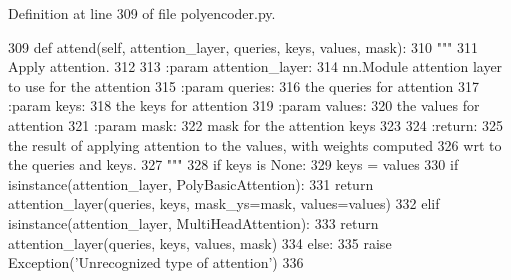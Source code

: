 Definition at line 309 of file polyencoder.\+py.


\begin{DoxyCode}
309     \textcolor{keyword}{def }attend(self, attention\_layer, queries, keys, values, mask):
310         \textcolor{stringliteral}{"""}
311 \textcolor{stringliteral}{        Apply attention.}
312 \textcolor{stringliteral}{}
313 \textcolor{stringliteral}{        :param attention\_layer:}
314 \textcolor{stringliteral}{            nn.Module attention layer to use for the attention}
315 \textcolor{stringliteral}{        :param queries:}
316 \textcolor{stringliteral}{            the queries for attention}
317 \textcolor{stringliteral}{        :param keys:}
318 \textcolor{stringliteral}{            the keys for attention}
319 \textcolor{stringliteral}{        :param values:}
320 \textcolor{stringliteral}{            the values for attention}
321 \textcolor{stringliteral}{        :param mask:}
322 \textcolor{stringliteral}{            mask for the attention keys}
323 \textcolor{stringliteral}{}
324 \textcolor{stringliteral}{        :return:}
325 \textcolor{stringliteral}{            the result of applying attention to the values, with weights computed}
326 \textcolor{stringliteral}{            wrt to the queries and keys.}
327 \textcolor{stringliteral}{        """}
328         \textcolor{keywordflow}{if} keys \textcolor{keywordflow}{is} \textcolor{keywordtype}{None}:
329             keys = values
330         \textcolor{keywordflow}{if} isinstance(attention\_layer, PolyBasicAttention):
331             \textcolor{keywordflow}{return} attention\_layer(queries, keys, mask\_ys=mask, values=values)
332         \textcolor{keywordflow}{elif} isinstance(attention\_layer, MultiHeadAttention):
333             \textcolor{keywordflow}{return} attention\_layer(queries, keys, values, mask)
334         \textcolor{keywordflow}{else}:
335             \textcolor{keywordflow}{raise} Exception(\textcolor{stringliteral}{'Unrecognized type of attention'})
336 
\end{DoxyCode}
\mbox{\label{classparlai_1_1agents_1_1transformer_1_1polyencoder_1_1PolyEncoderModule_a54ca3cb24e2a0fbbfa7b3f145c7558ed}} 
